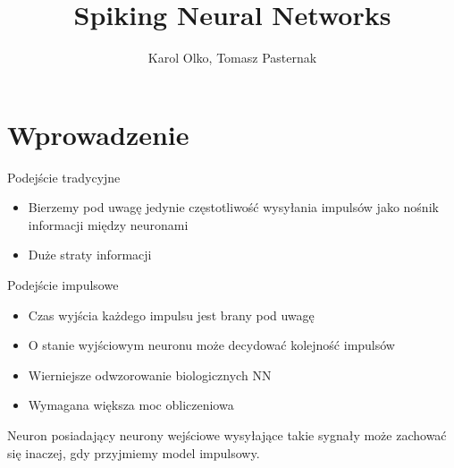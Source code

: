 \documentclass{beamer}
\author {Karol Olko, Tomasz Pasternak}
\title {Spiking Neural Networks}
\begin{document}
\frame{\titlepage}
\frame{\tableofcontents}
\section{Wprowadzenie}

\begin{frame}
  \begin{block}{Podejście tradycyjne}
    \begin{itemize}
    \item Bierzemy pod uwagę jedynie częstotliwość wysyłania impulsów jako nośnik informacji między neuronami
    \item Duże straty informacji
    \end{itemize}
  \end{block}
\end{frame}
\begin{frame}
  \begin{block}{Podejście impulsowe}
    \begin{itemize}
    \item<1-> Czas wyjścia każdego impulsu jest brany pod uwagę
    \item<2-> O stanie wyjściowym neuronu może decydować kolejność impulsów
    \item<3-> Wierniejsze odwzorowanie biologicznych NN
    \item<4-> Wymagana większa moc obliczeniowa
    \end{itemize}
  \end{block}
\end{frame}
\begin{frame}
  \begin{center}
  \end{center}
  Neuron posiadający neurony wejściowe wysyłające takie sygnały może zachować się inaczej, gdy przyjmiemy model impulsowy.
\end{frame}
\end{document}
